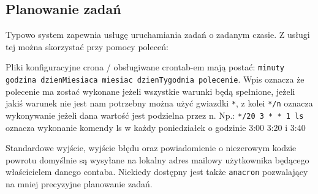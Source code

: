 \subsection{Planowanie zadań}
Typowo system zapewnia usługę uruchamiania zadań o zadanym czasie. Z usługi tej można skorzystać przy pomocy poleceń:
	Pliki konfiguracyjne crona / obsługiwane crontab-em mają postać: \texttt{minuty godzina  dzienMiesiaca miesiac dzienTygodnia polecenie}.
	Wpis oznacza że polecenie ma zostać wykonane jeżeli wszystkie warunki będą spełnione, jeżeli jakiś warunek nie jest nam potrzebny można użyć gwiazdki \texttt{*},
	z kolei \texttt{*/n} oznacza wykonywanie jeżeli dana wartość jest podzielna przez n. Np.:
		\texttt{*/20 3  * * 1 ls} oznacza wykonanie komendy ls w każdy poniedziałek o godzinie 3:00 3:20 i 3:40
	
	Standardowe wyjście, wyjście błędu oraz powiadomienie o niezerowym kodzie powrotu domyślnie są wysyłane na lokalny adres mailowy użytkownika będącego właścicielem danego contaba.
	Niekiedy dostępny jest także \texttt{anacron} pozwalający na mniej precyzyjne planowanie zadań.
